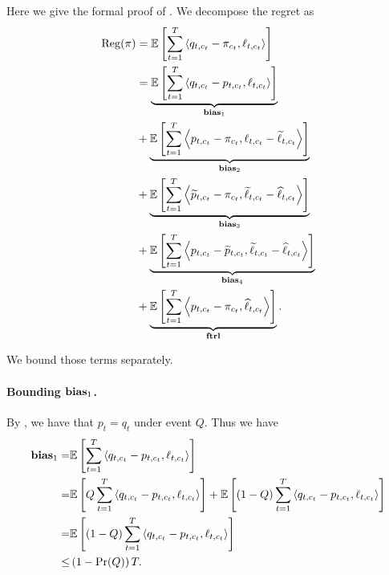 Here we give the formal proof of . We decompose the regret as
\begin{align*}
\operatorname{\mathrm{Reg}}(\pi) &= \mathbb{E}\left[\sum_{t=1}^T \left\langle q_{t, c_t}- \pi_{c_t}, \ell_{t, c_t} \right\rangle\right] \\
&=  \underbrace{\mathbb{E}\left[\sum_{t=1}^T \left\langle q_{t, c_t} - p_{t, c_t}, \ell_{t, c_t} \right\rangle\right]}_{\mathbf{bias}_{1}} \\
&+ \underbrace{\mathbb{E}\left[\sum_{t=1}^T \left\langle p_{t, c_t}- \pi_{c_t}, \ell_{t, c_t}-\widetilde{\ell}_{t, c_t} \right\rangle\right]}_{\mathbf{bias}_{2}} \\
& +\underbrace{\mathbb{E}\left[\sum_{t=1}^T \left\langle \widetilde{p}_{t, c_t}-\pi_{c_t}, \widetilde{\ell}_{t, c_t}-\widehat{\ell}_{t, c_t} \right\rangle\right]}_{\mathbf{bias}_{3}} \\
& +\underbrace{\mathbb{E}\left[\sum_{t=1}^T\left\langle  p_{t, c_t}-\widetilde{p}_{t, c_t}, \widetilde{\ell}_{t, c_t}-\widehat{\ell}_{t, c_t} \right\rangle\right]}_{\mathbf{bias}_{4}}\\
& +\underbrace{\mathbb{E}\left[\sum_{t=1}^T\left\langle  p_{t, c_t}-\pi_{c_t}, \widehat{\ell}_{t, c_t} \right\rangle\right]}_{\mathbf{ftrl}}.
\end{align*}

We bound those terms separately.

\paragraph{Bounding $\mathbf{bias}_{1}$.} By , we have that $p_t = q_t$ under event $Q$. Thus we have
\begin{align*}
    \mathbf{bias}_{1} =&\mathbb{E}\left[\sum_{t=1}^T \left\langle q_{t, c_t} - p_{t, c_t}, \ell_{t, c_t} \right\rangle\right] \\
    =& \mathbb{E}\left[Q \sum_{t=1}^T \left\langle q_{t, c_t} - p_{t, c_t}, \ell_{t, c_t} \right\rangle \right]  + \mathbb{E}\left[(1-Q) \sum_{t=1}^T \left\langle q_{t, c_t} - p_{t, c_t}, \ell_{t, c_t} \right\rangle \right] \\
    =& \mathbb{E}\left[(1-Q) \sum_{t=1}^T \left\langle q_{t, c_t} - p_{t, c_t}, \ell_{t, c_t} \right\rangle\right]\\
    \le& \left( 1- \Pr(Q) \right) T.
\end{align*}

